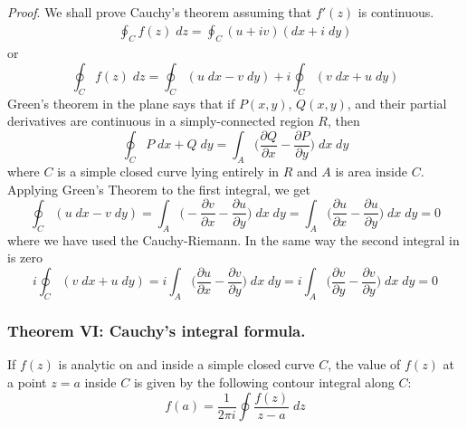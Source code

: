 \documentclass[../../../main.tex]{subfiles}
\begin{document}
\emph{Proof}. We shall prove Cauchy's theorem assuming that $f '(z)$ is continuous.
\begin{align*}
    \oint_C f(z) \;dz =\oint_C  (u + iv)(dx + i \;dy)
\end{align*}
or
\begin{equation*}
    \oint_C f(z) \;dz =\oint_C(u \;dx - v\; dy)+i\oint_C (v\; dx + u\; dy)
\end{equation*}
Green’s theorem in the plane says that if $P (x, y)$, $Q(x, y)$, and their partial derivatives are continuous in a simply-connected region $R$, then
\begin{equation*}
    \oint_C P\;dx+Q\;dy=\int_A \biggl(\frac{\partial Q}{\partial x}- \frac{\partial P}{\partial y}\biggr)\;dx\;dy
\end{equation*}
where $C$ is a simple closed curve lying entirely in $R$ and $A$ is area inside $C$. Applying Green's Theorem to the first integral, we get
\begin{equation*}
    \oint_C(u \;dx - v\; dy)=\int_A \biggl(-\frac{\partial v}{\partial x}- \frac{\partial u}{\partial y}\biggr)\;dx\;dy=\int_A \biggl(\frac{\partial u}{\partial x}- \frac{\partial u}{\partial y}\biggr)\;dx\;dy=0
\end{equation*}
where we have used the Cauchy-Riemann. In the same way the second integral in is zero
\begin{equation*}
    i\oint_C (v\; dx + u\; dy)=
    i\int_A \biggl(\frac{\partial u}{\partial x}- \frac{\partial v}{\partial y}\biggr)\;dx\;dy=
    i\int_A \biggl(\frac{\partial v}{\partial y}- \frac{\partial v}{\partial y}\biggr)\;dx\;dy=0
\end{equation*}

\subsubsection{Theorem VI: Cauchy's integral formula.} If $f(z)$ is analytic on and inside a simple closed curve $C$, the value of $f(z)$ at a point $z = a$ inside $C$ is given by the following contour integral along $C$:
\begin{equation*}
    f(a)=\frac{1}{2\pi i}\oint \frac{f(z)}{z-a}\;dz
\end{equation*}
\begin{figure}[h]
    \centering
\end{figure}
\end{document}
